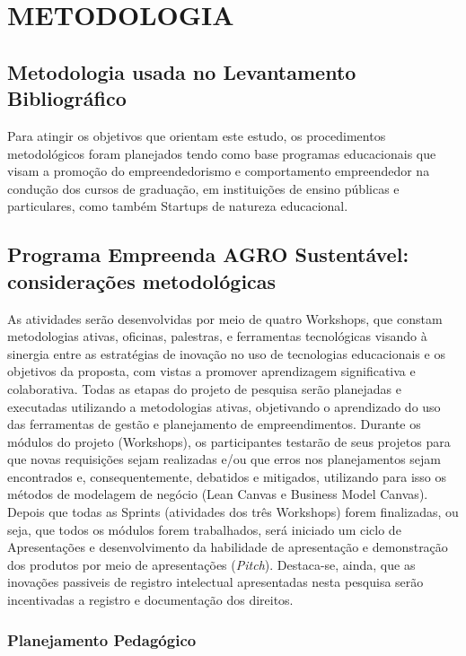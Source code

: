 \chapter{METODOLOGIA}

\section{Metodologia usada no Levantamento Bibliográfico}

Para atingir os objetivos que orientam este estudo, os procedimentos metodológicos foram planejados tendo como base programas educacionais que visam a promoção do empreendedorismo e comportamento empreendedor na condução dos cursos de graduação, em instituições de ensino públicas e particulares, como também Startups de natureza educacional.


\section{Programa Empreenda AGRO Sustentável: considerações metodológicas}


As atividades serão desenvolvidas por meio de quatro Workshops, que constam metodologias ativas, oficinas, palestras, e ferramentas tecnológicas visando à sinergia entre as estratégias de inovação no uso de tecnologias educacionais e os objetivos da proposta, com vistas a promover aprendizagem significativa e colaborativa. Todas as etapas do projeto de pesquisa serão planejadas e executadas utilizando a metodologias ativas, objetivando o aprendizado do uso das ferramentas de gestão e planejamento de empreendimentos.
Durante os módulos do projeto (Workshops), os participantes testarão de seus projetos para que novas requisições sejam realizadas e/ou que erros nos planejamentos sejam encontrados e, consequentemente, debatidos e mitigados, utilizando para isso os métodos de modelagem de negócio (Lean Canvas e Business Model Canvas). Depois que todas as Sprints (atividades dos três Workshops) forem finalizadas, ou seja, que todos os módulos forem trabalhados, será iniciado um ciclo de Apresentações e desenvolvimento da habilidade de apresentação e demonstração dos produtos por meio de apresentações (\textit{Pitch}). Destaca-se, ainda, que as inovações passiveis de registro intelectual apresentadas nesta pesquisa serão incentivadas a registro e documentação dos direitos.


\newpage
\subsection{Planejamento Pedagógico}

